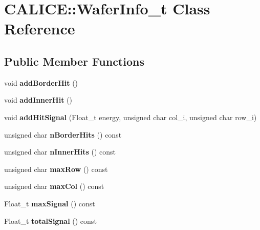 \section{CALICE::WaferInfo\_\-t Class Reference}
\label{classCALICE_1_1WaferInfo__t}
\subsection*{Public Member Functions}
\begin{DoxyCompactItemize}
\item 
void {\bfseries addBorderHit} ()\label{classCALICE_1_1WaferInfo__t_a667fa0a1634c214a3a6a98b6ce85ea68}

\item 
void {\bfseries addInnerHit} ()\label{classCALICE_1_1WaferInfo__t_afe1f12f38383236ddbb28ca6ee269c77}

\item 
void {\bfseries addHitSignal} (Float\_\-t energy, unsigned char col\_\-i, unsigned char row\_\-i)\label{classCALICE_1_1WaferInfo__t_a21e55668bddc8d4cc6b1814b9bbad307}

\item 
unsigned char {\bfseries nBorderHits} () const \label{classCALICE_1_1WaferInfo__t_a06d289e3d9c3b3d5a348b5a7f994d019}

\item 
unsigned char {\bfseries nInnerHits} () const \label{classCALICE_1_1WaferInfo__t_af7305039ddf2ea5cf7f97a9dcba2c276}

\item 
unsigned char {\bfseries maxRow} () const \label{classCALICE_1_1WaferInfo__t_a308f72e84cbefc4ac5694b2049969cef}

\item 
unsigned char {\bfseries maxCol} () const \label{classCALICE_1_1WaferInfo__t_ac7a95b41317f75a0fa1b97a6a909d294}

\item 
Float\_\-t {\bfseries maxSignal} () const \label{classCALICE_1_1WaferInfo__t_a19ddba62ea3924e9eb140838fc532882}

\item 
Float\_\-t {\bfseries totalSignal} () const \label{classCALICE_1_1WaferInfo__t_a59ad431cbb3005e069ee137988a034b1}

\end{DoxyCompactItemize}
